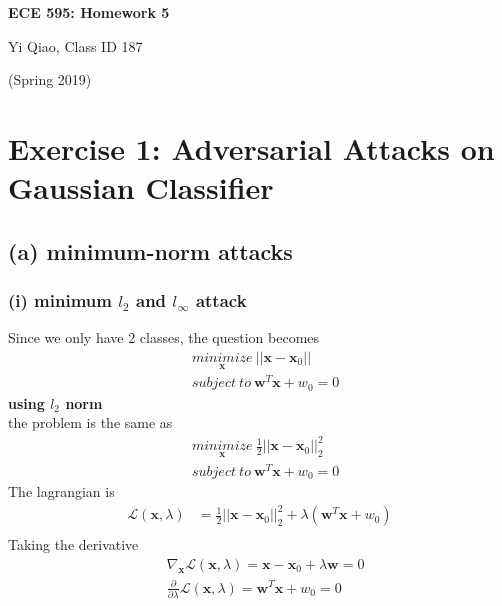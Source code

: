 \documentclass[11pt]{article}
\begin{document}
\begin{center}
\Large{\textbf{ECE 595: Homework 5}}

Yi Qiao, Class ID 187

(Spring 2019)
\end{center}

\section*{Exercise 1: Adversarial Attacks on Gaussian Classifier}
\subsection*{(a) minimum-norm attacks}
\subsubsection*{(i) minimum $l_2$ and $l_\infty$ attack}
Since we only have 2 classes, the question becomes
\begin{equation}
\begin{split}
&\underset{\pmb{x}}{minimize}\ ||\pmb{x} - \pmb{x}_0||\\
&subject\ to\ \pmb{w}^T\pmb{x} + w_0 = 0
\end{split}
\end{equation}
\noindent\textbf{using $l_2$ norm}\\
the problem is the same as\\
\begin{equation}
\begin{split}
&\underset{\pmb{x}}{minimize}\ \frac{1}{2}||\pmb{x} - \pmb{x}_0||^2_2\\
&subject\ to\ \pmb{w}^T\pmb{x} + w_0 = 0
\end{split}
\end{equation}
The lagrangian is
\begin{equation}
\begin{split}
\mathcal{L}(\pmb{x},\lambda) &= \frac{1}{2}||\pmb{x}-\pmb{x}_0||^2_2 + \lambda(\pmb{w}^T\pmb{x} + w_0)\\
\end{split}
\end{equation}
Taking the derivative
\begin{equation}
\begin{split}
&\nabla_{\pmb{x}}\mathcal{L}(\pmb{x},\lambda) = \pmb{x} - \pmb{x}_0 + \lambda\pmb{w}=0\\
&\frac{\partial}{\partial\lambda}\mathcal{L}(\pmb{x},\lambda)=\pmb{w}^T\pmb{x} + w_0=0
\end{split}
\end{equation}
\end{document}
